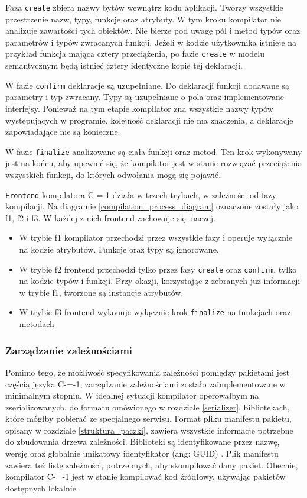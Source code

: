 Faza \lstinline{create} zbiera nazwy bytów wewnątrz kodu aplikacji.
Tworzy wszystkie przestrzenie nazw, typy, funkcje oraz atrybuty.
W tym kroku kompilator nie analizuje zawartości tych obiektów.
Nie bierze pod uwagę pól i metod typów oraz parametrów i typów zwracanych funkcji.
Jeżeli w kodzie użytkownika istnieje na przykład funkcja mająca cztery przeciążenia, po fazie \lstinline{create} w modelu semantycznym będą istnieć cztery identyczne kopie tej deklaracji.

W fazie \lstinline{confirm} deklaracje są uzupełniane.
Do deklaracji funkcji dodawane są parametry i typ zwracany.
Typy są uzupełniane o pola oraz implementowane interfejsy.
Ponieważ na tym etapie kompilator zna wszystkie nazwy typów występujących w programie, kolejność deklaracji nie ma znaczenia, a deklaracje zapowiadające nie są konieczne.

W fazie \lstinline{finalize}
analizowane są ciała funkcji oraz metod.
Ten krok wykonywany jest na końcu, aby upewnić się, że kompilator jest w stanie rozwiązać przeciążenia wszystkich funkcji, do których odwołania mogą się pojawić.

\lstinline{Frontend} kompilatora C-=-1 działa w trzech trybach, w zależności od fazy kompilacji.
Na diagramie \ref{compilation_process_diagram} oznaczone zostały jako f1, f2 i f3.
W każdej z nich frontend zachowuje się inaczej.
\begin{itemize}
  \item W trybie f1 kompilator przechodzi przez wszystkie fazy i operuje wyłącznie na kodzie atrybutów.
  Funkcje oraz typy są ignorowane.
  \item W trybie f2 frontend przechodzi tylko przez fazy \lstinline{create} oraz \lstinline{confirm}, tylko na kodzie typów i funkcji.
  Przy okazji, korzystając z zebranych już informacji w trybie f1, tworzone są instancje atrybutów.
  \item W trybie f3 frontend wykonuje wyłącznie krok \lstinline{finalize} na funkcjach oraz metodach
\end{itemize}


\subsubsection{Zarządzanie zależnościami}

Pomimo tego, że możliwość specyfikowania zależności pomiędzy pakietami jest częścią języka C-=-1, zarządzanie zależnościami zostało zaimplementowane w minimalnym stopniu.
W idealnej sytuacji kompilator operowałbym na zserializowanych, do formatu omówionego w rozdziale \ref{serializer}, bibliotekach, które mógłby pobierać ze specjalnego serwisu.
Format pliku manifestu pakietu, opisany w rozdziale \ref{struktura_paczki}, zawiera wszystkie informacje potrzebne do zbudowania drzewa zależności.
Biblioteki są identyfikowane przez nazwę, wersję oraz globalnie unikatowy identyfikator (ang: GUID) \cite{leach2005universally}.
Plik manifestu zawiera też listę zależności, potrzebnych, aby skompilować dany pakiet.
Obecnie, kompilator C-=-1 jest w stanie kompilować kod źródłowy, używając pakietów dostępnych lokalnie.

